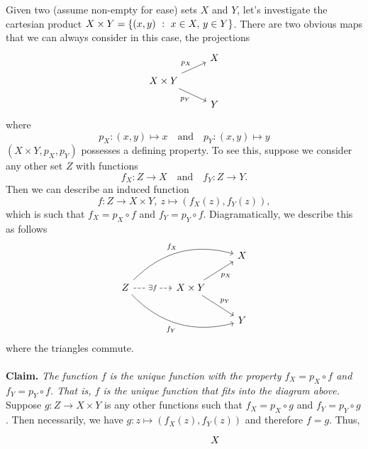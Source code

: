 \vspace*{1em}

\begin{example}\label{prodsetex}
Given two (assume non-empty for ease) sets $X$ and $Y$, let's investigate the cartesian product $X \times Y = \left\{(x,y)\ :\ x \in X,\,y \in Y\right\}$. There are two obvious maps that we can always consider in this case, the projections
\[\begin{tikzcd}[row sep = small]
                                               & X \\
X\times Y \arrow[ru, "p_X"] \arrow[rd, "p_Y"'] &   \\
                                               & Y
\end{tikzcd}\]
where
\[p_X:(x,y) \mapsto x \quad \text{and}\quad p_Y: (x,y) \mapsto y\]
$(X \times Y,p_X,p_Y)$ possesses a defining property. To see this, suppose we consider any other set $Z$ with functions
\[f_X:Z \to X \quad \text{and} \quad f_Y: Z \to Y.\]
Then we can describe an induced function
\[f:Z \to X \times Y,\ z \mapsto (f_X(z),f_Y(z)),\]
which is such that $f_X = p_X \circ f$ and $f_Y = p_Y \circ f$. Diagramatically, we describe this as follows
\[\begin{tikzcd}
                                                                                                          &    [1.5em]                                            & X \\
Z \arrow[rru, "f_X", bend left] \arrow[rrd, "f_Y"', bend right] \arrow[r, "\exists f" description, dashed] &[1.5em] X\times Y \arrow[ru, "p_X"'] \arrow[rd, "p_Y"] &   \\
                                                                                                          & [1.5em]                                               & Y
\end{tikzcd}\]
where the triangles commute.\\
\\
\textbf{Claim.} \emph{The function $f$ is the unique function with the property $f_X = p_X \circ f$ and $f_Y = p_Y \circ f$. That is, $f$ is the unique function that fits into the diagram above.}\\[0.5em]
Suppose $g:Z \to X\times Y$ is any other functions such that $f_X = p_X \circ g$ and $f_Y = p_Y \circ g$. Then necessarily, we have $g:z \mapsto (f_X(z),f_Y(z))$ and therefore $f = g$. Thus,
\[\begin{tikzcd}
                                                                                                          &    [1.5em]                                            & X \\

\end{tikzcd}\]
\end{example}

